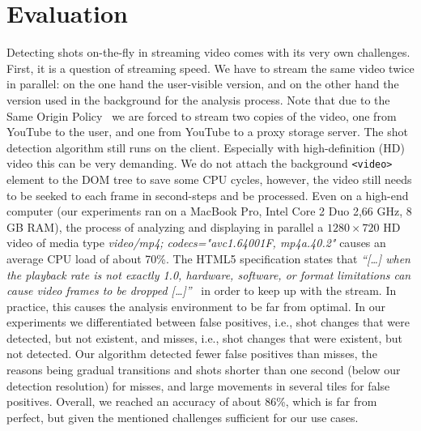 \documentclass{acm_proc_article-sp}
\begin{document}
\section{Evaluation} \label{sec:evaluation}
Detecting shots on-the-fly in streaming video comes with its very own challenges. First, it is a question of streaming speed. We have to stream the same video twice in parallel: on the one hand the user-visible version, and on the other hand the version used in the background for the analysis process. Note that due to the Same Origin Policy~\cite{sameoriginpolicy} we are forced to stream two copies of the video, one from YouTube to the user, and one from YouTube to a proxy storage server. The shot detection algorithm still runs on the client. Especially with high-definition (HD) video this can be very demanding. We do not attach the background \texttt{<video>} element to the DOM tree to save some CPU cycles, however, the video still needs to be seeked to each frame in second-steps and be processed. Even on a high-end computer (our experiments ran on a MacBook Pro, Intel Core 2 Duo 2,66 GHz, 8 GB RAM), the process of analyzing and displaying in parallel a $\mathit{1280} \times \mathit{720}$ HD video of media type \emph{video/mp4; codecs="avc1.64001F, mp4a.40.2"} causes an average CPU load of about 70\%. The HTML5 specification states that \textit{``[\ldots] when the playback rate is not exactly 1.0, hardware, software, or format limitations can cause video frames to be dropped [\ldots]''}~\cite{whatwgvideo} in order to keep up with the stream. In practice, this causes the analysis environment to be far from optimal. In our experiments we differentiated between false positives, i.e., shot changes that were detected, but not existent, and misses, i.e., shot changes that were existent, but not detected. Our algorithm detected fewer false positives than misses, the reasons being gradual transitions and shots shorter than one second (below our detection resolution) for misses, and large movements in several tiles for false positives. Overall, we reached an accuracy of about 86\%, which is far from perfect, but given the mentioned challenges sufficient for our use cases. 
\end{document}
